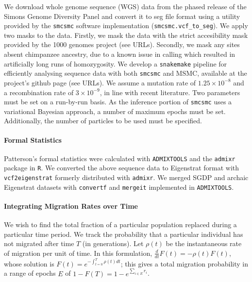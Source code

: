 \documentclass{article}
\begin{document}
We download whole genome sequence (WGS) data from the phased release of the Simons Genome Diversity Panel and convert it to seg file format using a utility provided by the {\tt smcsmc} software implementation ({\tt smcsmc.vcf\_to\_seg}). We apply two masks to the data. Firstly, we mask the data with the strict accesibility mask provided by the 1000 genomes project (see URLs). Secondly, we mask any sites absent chimpanzee ancestry, due to a known issue in calling which resulted in artificially long runs of homozygosity. We develop a {\tt snakemake} pipeline for efficiently analysing sequence data with both {\tt smcsmc} and MSMC, available at the project's github page (see URLs). We assume a mutation rate of $1.25\times10^{-8}$ and a recombination rate of $3\times10^{-9}$, in line with recent literature. Two parameters must be set on a run-by-run basis. As the inference portion of {\tt smcsmc} uses a variational Bayesian approach, a number of maximum epochs must be set. Additionally, the number of particles to be used must be specified. 


\paragraph{Formal Statistics} Patterson's formal statistics were calculated with {\tt ADMIXTOOLS} \cite{Patterson2012} and the {\tt admixr} package \cite{Petr2019} in {\tt R}. We converted the above sequence data to Eigenstrat format with {\tt vcf2eigenstrat} %
formerly distributed with {\tt admixr}. We merged SGDP and archaic Eigenstrat datasets with {\tt convertf} and {\tt mergeit} implemented in {\tt ADMIXTOOLS}. 


\paragraph{Integrating Migration Rates over Time}
We wish to find the total fraction of a particular population replaced during a particular time period. We track the probability that a particular individual has not migrated after time $T$ (in generations). Let $\rho(t)$ be the instantaneous rate of migration per unit of time. In this formulation, $\frac{d}{dt} F(t) = - \rho(t) F(t)$, whose solution is $F(t) = e^{- \int_{t=0}^T \rho(t) dt}$; this gives a total migration probability in a range of epochs $E$ of  $1-F(T) = 1 - e^{\sum_{i \in E} r_i}$. 
\end{document}
